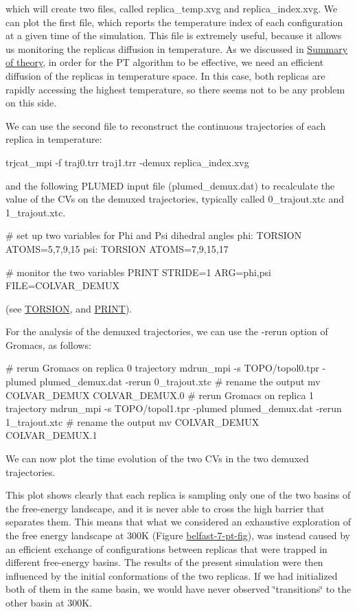 which will create two files, called replica\+\_\+temp.\+xvg and replica\+\_\+index.\+xvg. We can plot the first file, which reports the temperature index of each configuration at a given time of the simulation. This file is extremely useful, because it allows us monitoring the replicas diffusion in temperature. As we discussed in \hyperlink{belfast-7_belfast-7-theory}{Summary of theory}, in order for the P\+T algorithm to be effective, we need an efficient diffusion of the replicas in temperature space. In this case, both replicas are rapidly accessing the highest temperature, so there seems not to be any problem on this side.

We can use the second file to reconstruct the continuous trajectories of each replica in temperature\+:

\begin{DoxyVerb}trjcat_mpi -f traj0.trr traj1.trr -demux replica_index.xvg
\end{DoxyVerb}


and the following P\+L\+U\+M\+E\+D input file (plumed\+\_\+demux.\+dat) to recalculate the value of the C\+Vs on the demuxed trajectories, typically called 0\+\_\+trajout.\+xtc and 1\+\_\+trajout.\+xtc.

\begin{DoxyVerb}# set up two variables for Phi and Psi dihedral angles 
phi: TORSION ATOMS=5,7,9,15
psi: TORSION ATOMS=7,9,15,17

# monitor the two variables
PRINT STRIDE=1 ARG=phi,psi FILE=COLVAR_DEMUX\end{DoxyVerb}
 (see \hyperlink{TORSION}{T\+O\+R\+S\+I\+O\+N}, and \hyperlink{PRINT}{P\+R\+I\+N\+T}).

For the analysis of the demuxed trajectories, we can use the -\/rerun option of Gromacs, as follows\+:

\begin{DoxyVerb}# rerun Gromacs on replica 0 trajectory
mdrun_mpi -s TOPO/topol0.tpr -plumed plumed_demux.dat -rerun 0_trajout.xtc
# rename the output
mv COLVAR_DEMUX COLVAR_DEMUX.0
# rerun Gromacs on replica 1 trajectory
mdrun_mpi -s TOPO/topol1.tpr -plumed plumed_demux.dat -rerun 1_trajout.xtc
# rename the output
mv COLVAR_DEMUX COLVAR_DEMUX.1
\end{DoxyVerb}


We can now plot the time evolution of the two C\+Vs in the two demuxed trajectories.

\label{belfast-7_belfast-7-ptdemux-fig}%
\hypertarget{belfast-7_belfast-7-ptdemux-fig}{}%
 This plot shows clearly that each replica is sampling only one of the two basins of the free-\/energy landscape, and it is never able to cross the high barrier that separates them. This means that what we considered an exhaustive exploration of the free energy landscape at 300\+K (Figure \hyperlink{belfast-7_belfast-7-pt-fig}{belfast-\/7-\/pt-\/fig}), was instead caused by an efficient exchange of configurations between replicas that were trapped in different free-\/energy basins. The results of the present simulation were then influenced by the initial conformations of the two replicas. If we had initialized both of them in the same basin, we would have never observed \char`\"{}transitions\char`\"{} to the other basin at 300\+K.

